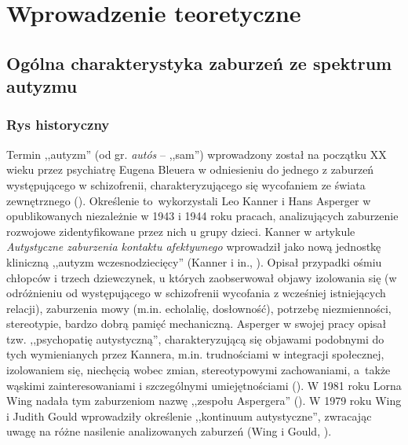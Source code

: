 \chapter{Wprowadzenie teoretyczne}
\thispagestyle{firststyle}

\section{Ogólna charakterystyka zaburzeń ze spektrum autyzmu}

    \subsection{Rys historyczny}
    Termin ,,autyzm'' (od gr. \emph{autós} -- ,,sam'') wprowadzony został na początku XX wieku przez psychiatrę Eugena Bleuera w odniesieniu do jednego z zaburzeń występującego w schizofrenii, charakteryzującego się wycofaniem ze świata zewnętrznego (\cite{frith2008autyzm}).
    Określenie to~wykorzystali Leo Kanner i Hans Asperger w opublikowanych niezależnie w 1943 i 1944 roku pracach, analizujących zaburzenie rozwojowe zidentyfikowane przez nich u grupy dzieci.
    Kanner w artykule \emph{Autystyczne zaburzenia kontaktu afektywnego} wprowadził jako nową jednostkę kliniczną ,,autyzm wczesnodziecięcy'' (Kanner i in., \cite*{kanner1943autistic}).
    Opisał przypadki ośmiu chłopców i trzech dziewczynek, u których zaobserwował objawy izolowania się (w odróżnieniu od występującego w schizofrenii wycofania z wcześniej istniejących relacji), zaburzenia mowy (m.in. echolalię, dosłowność), potrzebę niezmienności, stereotypie, bardzo dobrą pamięć mechaniczną.
    Asperger w swojej pracy opisał tzw. ,,psychopatię autystyczną'', charakteryzującą się objawami podobnymi do tych wymienianych przez Kannera, m.in. trudnościami w integracji społecznej, izolowaniem się, niechęcią wobec zmian, stereotypowymi zachowaniami, a~także wąskimi zainteresowaniami i szczególnymi umiejętnościami (\cite{asperger1991autistic}).
    W 1981 roku Lorna Wing nadała tym zaburzeniom nazwę ,,zespołu Aspergera'' (\cite{wing1981asperger}).
    W 1979 roku Wing i Judith Gould wprowadziły określenie ,,kontinuum autystyczne'', zwracając uwagę na różne nasilenie analizowanych zaburzeń (Wing i Gould, \cite*{wing1979severe}).
    

